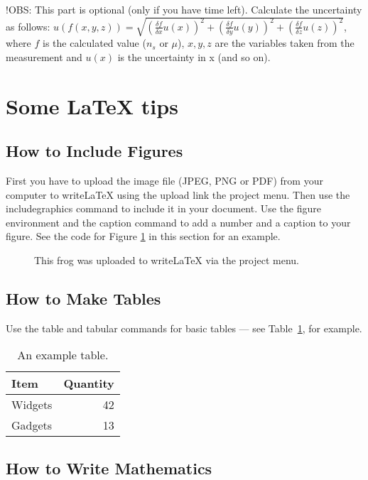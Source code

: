 \documentclass[a4paper]{article}
\begin{document}
!OBS: This part is optional (only if you have time left).
Calculate the uncertainty as follows: \newline $u(f(x, y, z)) = \sqrt{(\frac{\delta f}{\delta{x}} u(x))^{2} + (\frac{\delta f}{\delta{y}} u(y))^{2} + (\frac{\delta f}{\delta{z}} u(z))^{2}}$, where $f$ is the calculated value ($n_{s}$ or $\mu$), $x, y, z$ are the variables taken from the measurement and $u(x)$ is the uncertainty in x (and so on).
      
\section{Some LaTeX tips}
\label{sec:latex}
\subsection{How to Include Figures}
      
First you have to upload the image file (JPEG, PNG or PDF) from your computer to writeLaTeX using the upload link the project menu. Then use the includegraphics command to include it in your document. Use the figure environment and the caption command to add a number and a caption to your figure. See the code for Figure \ref{fig:frog} in this section for an example.
      
\begin{figure}
	\centering
	\caption{\label{fig:frog}This frog was uploaded to writeLaTeX via the project menu.}
\end{figure}
      
\subsection{How to Make Tables}
      
Use the table and tabular commands for basic tables --- see Table~\ref{tab:widgets}, for example.
      
\begin{table}
	\centering
	\begin{tabular}{l|r}
		Item    & Quantity \\\hline
		Widgets & 42       \\
		Gadgets & 13       
	\end{tabular}
	\caption{\label{tab:widgets}An example table.}
\end{table}
      
\subsection{How to Write Mathematics}
      
\end{document}
